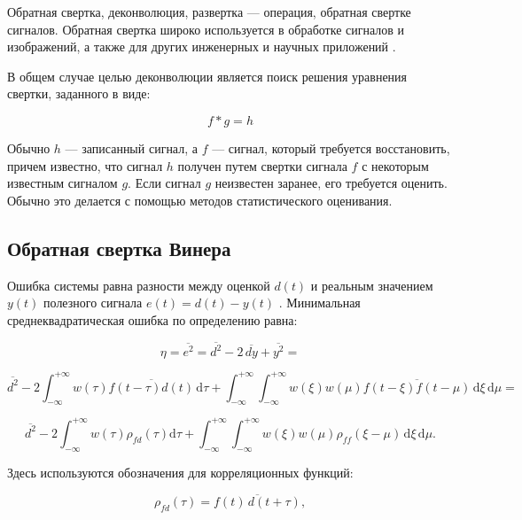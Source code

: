Обратная свертка, деконволюция, развертка --- операция, обратная свертке сигналов. Обратная свертка широко используется в обработке сигналов и изображений, а также для других инженерных и научных приложений \cite{deconvolution}.

В общем случае целью деконволюции является поиск решения уравнения свертки, заданного в виде:

\begin{equation}
	f*g=h
\end{equation}


Обычно $h$ --- записанный сигнал, а $f$ --- сигнал, который требуется восстановить, причем известно, что сигнал $h$ получен путем свертки сигнала $f$ с некоторым известным сигналом $g$. Если сигнал $g$ неизвестен заранее, его требуется оценить. Обычно это делается с помощью методов статистического оценивания.


\subsection{Обратная свертка Винера}

Ошибка системы равна разности между оценкой $d(t)$ и реальным значением $y(t)$ полезного сигнала $e(t)=d(t)-y(t)$ \cite{wd}. Минимальная среднеквадратическая ошибка по определению равна:

\begin{equation*}
	\eta=\overline{e^{2}}=\overline{d^{2}}-2\,\overline{dy}+\overline{y^{2}} =
\end{equation*}

\begin{equation*}
\overline{d^{2}}-2\int_{-\infty}^{+\infty} w(\tau)\overline{f(t-\tau)d(t)} \, \mathrm{d}\tau + \int_{-\infty}^{+\infty}\int_{-\infty}^{+\infty}w(\xi)w(\mu)\overline{f(t-\xi)f(t-\mu)}\, \mathrm{d}\xi\, \mathrm{d}\mu =
\end{equation*}

\begin{equation}
\overline{d^{2}}-2\int_{-\infty}^{+\infty} w(\tau)\rho_{fd}(\tau) \mathrm{d}\tau+\int_{-\infty}^{+\infty}\int_{-\infty}^{+\infty}w(\xi)w(\mu)\rho_{ff}(\xi-\mu) \,\mathrm{d}\xi \,\mathrm{d} \mu.
\end{equation}


Здесь используются обозначения для корреляционных функций:

\begin{equation*}
\rho_{fd}(\tau)=\overline{f(t)\,d(t+\tau)},
\end{equation*}

